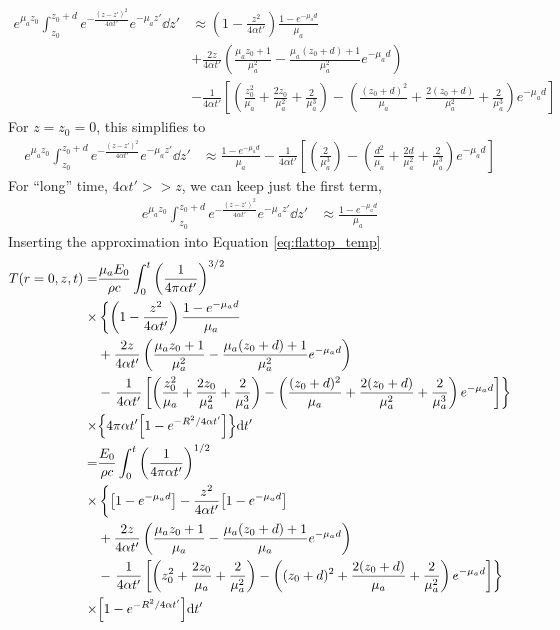\documentclass[]{article}
\begin{document}
\begin{align*}
  e^{\mu_a z_0}  \int_{z_0}^{z_0 + d} e^{-\frac{(z-z')^2}{4\alpha t'}} e^{-\mu_a z'} \dd z' &\approx
  \left(1 -  \frac{z^2}{4\alpha t'}\right)\frac{1 - e^{-\mu_a d}}{\mu_a} \\
    &+ \frac{2z}{4\alpha t'} \left( \frac{\mu_a z_0 + 1}{\mu_a^2} - \frac{\mu_a (z_0+d) + 1}{\mu_a^2}e^{-\mu_a d}\right) \\
    &- \frac{1}{4\alpha t'}\left[
   \left( \frac{z_0^2}{\mu_a} + \frac{2z_0}{\mu_a^2} + \frac{2}{\mu_a^3} \right) -
   \left( \frac{(z_0 + d)^2}{\mu_a} + \frac{2(z_0 + d)}{\mu_a^2} + \frac{2}{\mu_a^3} \right)e^{-\mu_a d}
   \right]
\end{align*}
For $z=z_0=0$, this simplifies to
\begin{align*}
    e^{\mu_a z_0}\int_{z_0}^{z_0 + d} e^{-\frac{(z-z')^2}{4\alpha t'}} e^{-\mu_a z'} \dd z' &\approx
    \frac{1 - e^{-\mu_a d}}{\mu_a}
    - \frac{1}{4\alpha t'}\left[
   \left( \frac{2}{\mu_a^3} \right) -
   \left( \frac{d^2}{\mu_a} + \frac{2d}{\mu_a^2} + \frac{2}{\mu_a^3} \right)e^{-\mu_a d}
   \right]
\end{align*}
For ``long'' time, $4\alpha t' >> z$, we can keep just the first term,
\begin{align*}
   e^{\mu_a z_0} \int_{z_0}^{z_0 + d} e^{-\frac{(z-z')^2}{4\alpha t'}} e^{-\mu_a z'} \dd z' &\approx
    \frac{1 - e^{-\mu_a d}}{\mu_a}
\end{align*}
Inserting the approximation into Equation \ref{eq:flattop_temp}
\begin{align}
  \label{eq:flattop_temp_approx}
  T(r=0, z,t) =& \frac{\mu_a E_0}{\rho c} \int_0^t \qty(\frac{1}{4\pi \alpha t'})^{3/2}  \nonumber \\
  \times & \left\{\left(1 -  \frac{z^2}{4\alpha t'}\right)\frac{1 - e^{-\mu_a d}}{\mu_a} \right.\nonumber \\
    &+ \frac{2z}{4\alpha t'} \left( \frac{\mu_a z_0 + 1}{\mu_a^2} - \frac{\mu_a (z_0+d) + 1}{\mu_a^2}e^{-\mu_a d}\right) \nonumber \\
    &- \left.\frac{1}{4\alpha t'}\left[
   \left( \frac{z_0^2}{\mu_a} + \frac{2z_0}{\mu_a^2} + \frac{2}{\mu_a^3} \right) -
   \left( \frac{(z_0 + d)^2}{\mu_a} + \frac{2(z_0 + d)}{\mu_a^2} + \frac{2}{\mu_a^3} \right)e^{-\mu_a d}
 \right]
\right\} \nonumber \\
  \times & \qty{4\pi \alpha t' \qty[1 - e^{-R^2/4\alpha t'}] }
  \dd t' \\
  =&
  \frac{E_0}{\rho c} \int_0^t \qty(\frac{1}{4\pi \alpha t'})^{1/2}  \nonumber \nonumber \\
  \times & \left\{\qty[1 - e^{-\mu_a d}]   -  \frac{z^2}{4\alpha t'}\qty[1 - e^{-\mu_a d}]\right. \nonumber \\
    &+ \frac{2z}{4\alpha t'} \left( \frac{\mu_a z_0 + 1}{\mu_a} - \frac{\mu_a (z_0+d) + 1}{\mu_a}e^{-\mu_a d}\right) \nonumber \\
    &- \left.\frac{1}{4\alpha t'}\left[
   \left( z_0^2       + \frac{2z_0}{\mu_a} + \frac{2}{\mu_a^2} \right) -
   \left( (z_0 + d)^2 + \frac{2(z_0 + d)}{\mu_a} + \frac{2}{\mu_a^2} \right)e^{-\mu_a d}
 \right]
\right\} \nonumber \\
  \times & \qty[1 - e^{-R^2/4\alpha t'}]
  \dd t'
\end{align}
\end{document}
